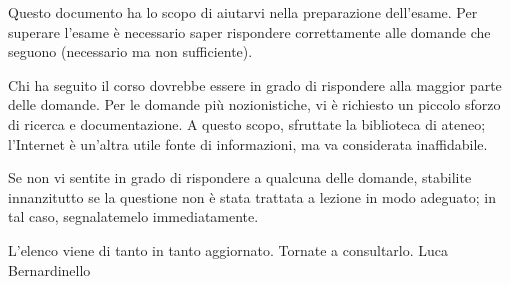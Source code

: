 \begin{description}[]
	\item[Bernardinello's preface]
Questo documento ha lo scopo di aiutarvi nella preparazione dell'esame. Per superare l'esame è necessario saper rispondere correttamente alle domande che seguono (necessario ma non sufficiente).

Chi ha seguito il corso dovrebbe essere in grado di rispondere alla maggior parte delle domande. Per le domande più nozionistiche, vi è richiesto un piccolo sforzo di ricerca e documentazione. A questo scopo, sfruttate la biblioteca di ateneo; l'Internet è un'altra utile fonte di informazioni, ma va considerata inaffidabile.

Se non vi sentite in grado di rispondere a qualcuna delle domande, stabilite innanzitutto se la questione non è stata trattata a lezione in modo adeguato; in tal caso, segnalatemelo immediatamente.

L'elenco viene di tanto in tanto aggiornato. Tornate a consultarlo.
\newline
\newline
Luca Bernardinello

	


\end{description}
